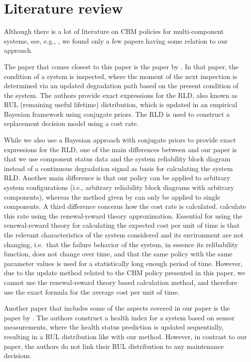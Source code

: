 \documentclass[authoryear]{elsarticle}
\begin{document}
\section{Literature review}
\label{sec:literature}

Although there is a lot of literature on CBM policies for multi-component systems,
see, e.g., \citet{2017:oldekeizer},
we found only a few papers having some relation to our approach.

The paper that comes closest to this paper is the paper by \citet{2013:si-et-al}.
In that paper, the condition of a system is inspected,
where the moment of the next inspection is determined via an updated degradation path based on the present condition of the system.
The authors provide exact expressions for the RLD,
also known as RUL (remaining useful lifetime) distribution,
which is updated in an empirical Bayesian framework using conjugate priors.
The RLD is used to construct a replacement decision model using a cost rate.

While we also use a Bayesian approach with conjugate priors to provide exact expressions for the RLD,
one of the main differences between \citet{2013:si-et-al} and our paper
is that we use component status data and the system reliability block diagram instead of a continuous degradation signal
as basis for calculating the system RLD.
Another main difference is that our policy can be applied to arbitrary system configurations
(i.e., arbitrary reliability block diagrams with arbitrary components),
whereas the method given by \citet{2013:si-et-al} can only be applied to single components.
A third difference concerns how the cost rate is calculated.
\citet{2013:si-et-al} calculate this rate using the renewal-reward theory approximation.
Essential for using the renewal-reward theory for calculating the expected cost per unit of time
is that the relevant characteristics of the system considered and its environment are not changing,
i.e.\ that the failure behavior of the system,
in essence its relibability function, does not change over time,
and that the same policy with the same parameter values is used for a statistically long enough period of time.
However, due to the update method related to the CBM policy presented in this paper, %
we cannot use the renewal-reward theory based calculation method,
and therefore use the exact formula for the average cost per unit of time.

Another paper that includes some of the aspects covered in our paper is the paper by \citet{2012:sun-et-al}.
The authors construct a health index for a system based on sensor measurements,
where the health status prediction is updated sequentially,
resulting in a RUL distribution like with our method.
However, in contrast to our paper, the authors do not link their RUL distribution to any maintenance decisions.
\end{document}
